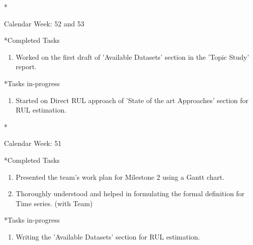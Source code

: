 \documentclass[11pt,a4paper]{article}
\begin{document}
\newpage
\begin{section}*{Calendar Week: 52 and 53 \hfill \date{30 December, 2020}}
 \begin{refsection}
     \begin{subsection}*{Completed Tasks}
         \begin{enumerate}
             \item
                   Worked on the first draft of 'Available Datasets' section in the 'Topic Study' report.
         \end{enumerate}
     \end{subsection}

     \begin{subsection}*{Tasks in-progress}
         \begin{enumerate}
             \item
                   Started on Direct RUL approach of 'State of the art Approaches' section for RUL estimation.
         \end{enumerate}
     \end{subsection}
 \end{refsection}
\end{section}
\newpage
\begin{section}*{Calendar Week: 51 \hfill \date{18 December, 2020}}
 \begin{refsection}
     \begin{subsection}*{Completed Tasks}
         \begin{enumerate}
             \item
                   Presented the team's work plan for Milestone 2 using a Gantt chart.
             \item
                   Thoroughly understood and helped in formulating the formal definition for Time series. (with Team)
         \end{enumerate}
     \end{subsection}

     \begin{subsection}*{Tasks in-progress}
         \begin{enumerate}
             \item
                   Writing the 'Available Datasets' section for RUL estimation.
         \end{enumerate}
     \end{subsection}
 \end{refsection}
\end{section}
\end{document}
